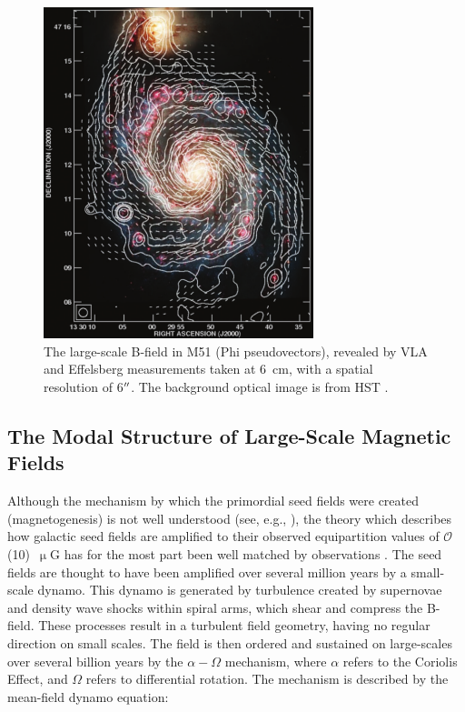 \begin{figure}[!htbp]
\centering
\includegraphics[width=0.7\textwidth]{figures/galaxies/m51}
\caption[~A composite radio image of the large-scale B-field in M51.]{The large-scale B-field in M51 (\gls{Phi} pseudovectors), revealed by VLA and Effelsberg measurements taken at 6~cm, with a spatial resolution of 6$\operatorname{^{\prime\prime}}$. The background optical image is from HST \citep{fletcher2011magnetic}.}
\label{fig:m51}
\end{figure}

\subsection{The Modal Structure of Large-Scale Magnetic Fields}\label{dynamo}

Although the mechanism by which the primordial seed fields were created (magnetogenesis) is not well understood (see, e.g., \citet{kandus2011primordial}), the theory which describes how galactic seed fields are amplified to their observed equipartition values of $\mathcal{O}$(10)~$\upmu$G has for the most part been well matched by observations \citep{beck2006origin}. The seed fields are thought to have been amplified over several million years by a small-scale dynamo. This dynamo is generated by turbulence created by supernovae and density wave shocks within spiral arms, which shear and compress the B-field. These processes result in a turbulent field geometry, having no regular direction on small scales. The field is then ordered and sustained on large-scales over several billion years by the $\alpha-\Omega$ mechanism, where $\alpha$ refers to the Coriolis Effect, and $\Omega$ refers to differential rotation. The mechanism is described by the mean-field dynamo equation:

